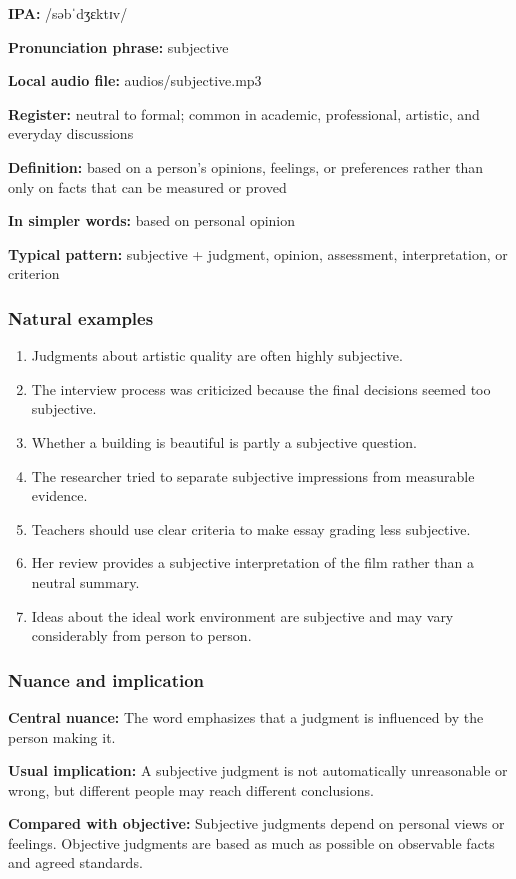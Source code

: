 \documentclass[11pt]{article}
\begin{document}
\textbf{IPA:} /səbˈdʒɛktɪv/

\textbf{Pronunciation phrase:} subjective

\textbf{Local audio file:} audios/subjective.mp3

\textbf{Register:} neutral to formal; common in academic, professional, artistic, and everyday discussions

\textbf{Definition:} based on a person's opinions, feelings, or preferences rather than only on facts that can be measured or proved

\textbf{In simpler words:} based on personal opinion

\textbf{Typical pattern:} subjective + judgment, opinion, assessment, interpretation, or criterion

\subsubsection{Natural examples}
\begin{enumerate}
  \item Judgments about artistic quality are often highly subjective.
  \item The interview process was criticized because the final decisions seemed too subjective.
  \item Whether a building is beautiful is partly a subjective question.
  \item The researcher tried to separate subjective impressions from measurable evidence.
  \item Teachers should use clear criteria to make essay grading less subjective.
  \item Her review provides a subjective interpretation of the film rather than a neutral summary.
  \item Ideas about the ideal work environment are subjective and may vary considerably from person to person.
\end{enumerate}

\subsubsection{Nuance and implication}
\textbf{Central nuance:} The word emphasizes that a judgment is influenced by the person making it.

\textbf{Usual implication:} A subjective judgment is not automatically unreasonable or wrong, but different people may reach different conclusions.

\textbf{Compared with objective:} Subjective judgments depend on personal views or feelings. Objective judgments are based as much as possible on observable facts and agreed standards.
\end{document}
